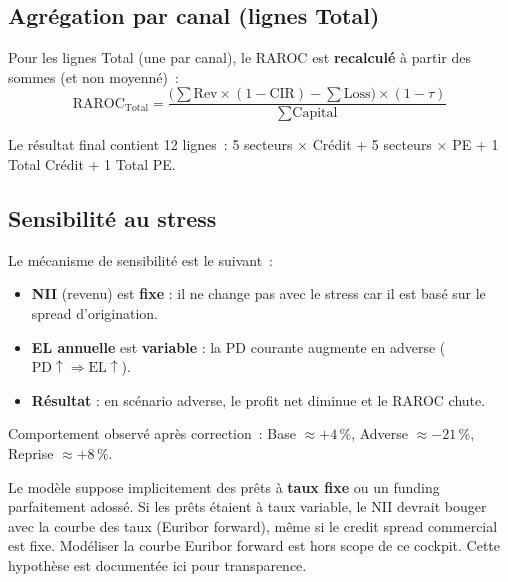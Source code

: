 \documentclass[12pt,a4paper]{article}
\begin{document}
\subsection{Agr\'egation par canal (lignes Total)}

Pour les lignes Total (une par canal), le RAROC est \textbf{recalcul\'e} \`a partir des sommes (et non moyenn\'e)~:
\begin{equation}
    \text{RAROC}_{\text{Total}} = \frac{\bigl(\sum \text{Rev} \times (1-\text{CIR}) - \sum \text{Loss}\bigr) \times (1-\tau)}{\sum \text{Capital}}
    \label{eq:raroc_total}
\end{equation}

Le r\'esultat final contient 12 lignes~: 5 secteurs $\times$ Cr\'edit + 5 secteurs $\times$ PE + 1 Total Cr\'edit + 1 Total PE.

\subsection{Sensibilit\'e au stress}

Le m\'ecanisme de sensibilit\'e est le suivant~:
\begin{itemize}[nosep]
    \item \textbf{NII} (revenu) est \textbf{fixe} : il ne change pas avec le stress car il est bas\'e sur le spread d'origination.
    \item \textbf{EL annuelle} est \textbf{variable} : la PD courante augmente en adverse ($\text{PD} \uparrow \Rightarrow \text{EL} \uparrow$).
    \item \textbf{R\'esultat} : en sc\'enario adverse, le profit net diminue et le RAROC chute.
\end{itemize}

Comportement observ\'e apr\`es correction~: Base $\approx +4\,\%$, Adverse $\approx -21\,\%$, Reprise $\approx +8\,\%$.

\begin{warningbox}
Le mod\`ele suppose implicitement des pr\^ets \`a \textbf{taux fixe} ou un funding parfaitement adoss\'e. Si les pr\^ets \'etaient \`a taux variable, le NII devrait bouger avec la courbe des taux (Euribor forward), m\^eme si le credit spread commercial est fixe. Mod\'eliser la courbe Euribor forward est hors scope de ce cockpit. Cette hypoth\`ese est document\'ee ici pour transparence.
\end{warningbox}

\end{document}
